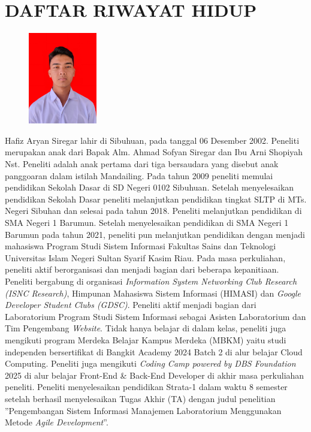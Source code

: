 %
%
%
%

\chapter*{DAFTAR RIWAYAT HIDUP}
\pagestyle{empty}

\noindent
\begin{figure}\vspace{-15pt}
	\includegraphics[width=3cm, height=4cm]{konten/gambar/fotoprofil.jpg}\vspace{-15pt}
\end{figure}
Hafiz Aryan Siregar lahir di Sibuhuan, pada tanggal 06 Desember 2002. Peneliti merupakan anak dari Bapak Alm. Ahmad Sofyan Siregar dan Ibu Arni Shopiyah Nst. Peneliti adalah anak pertama dari tiga bersaudara yang disebut anak panggoaran dalam istilah Mandailing. Pada tahun 2009 peneliti memulai pendidikan Sekolah Dasar di SD Negeri 0102 Sibuhuan. Setelah menyelesaikan pendidikan Sekolah Dasar peneliti melanjutkan pendidikan tingkat SLTP di MTs. Negeri Sibuhan dan selesai pada tahun 2018. Peneliti melanjutkan pendidikan di SMA Negeri 1 Barumun. Setelah menyelesaikan pendidikan di SMA Negeri 1 Barumun pada tahun 2021, peneliti pun melanjutkan pendidikan dengan menjadi mahasiswa Program Studi Sistem Informasi Fakultas Sains dan Teknologi Universitas Islam Negeri Sultan Syarif Kasim Riau. Pada masa perkuliahan, peneliti aktif berorganisasi dan menjadi bagian dari beberapa kepanitiaan. Peneliti bergabung di organisasi \textit{Information System Networking Club Research (ISNC Research)}, Himpunan Mahasiswa Sistem Informasi (HIMASI) dan \textit{Google Developer Student Clubs (GDSC)}. Peneliti aktif menjadi bagian dari Laboratorium Program Studi Sistem Informasi sebagai Asisten Laboratorium dan Tim Pengembang \textit{Website}. Tidak hanya belajar di dalam kelas, peneliti juga mengikuti program Merdeka Belajar Kampus Merdeka (MBKM) yaitu studi independen bersertifikat di Bangkit Academy 2024 Batch 2 di alur belajar Cloud Computing. Peneliti juga mengikuti \textit{Coding Camp powered by DBS Foundation} 2025 di alur belajar Front-End \& Back-End Developer di akhir masa perkuliahan peneliti. Peneliti menyelesaikan pendidikan Strata-1 dalam waktu 8 semester setelah berhasil menyelesaikan Tugas Akhir (TA) dengan judul penelitian ”Pengembangan Sistem Informasi Manajemen Laboratorium Menggunakan Metode \textit{Agile Development}”.
